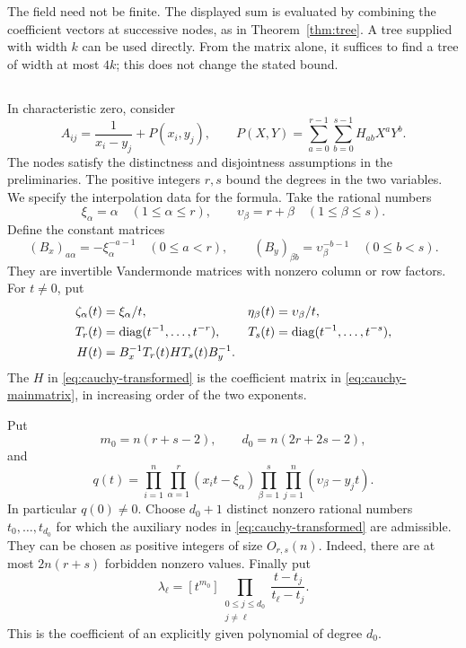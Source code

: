 \documentclass[11pt,reqno]{amsart}
\theoremstyle{remark}
\numberwithin{equation}{section}
\newcommand{\diag}{\operatorname{diag}}
\begin{document}
The field need not be finite. The displayed sum is evaluated by
combining the coefficient vectors at successive nodes, as in
Theorem~\ref{thm:tree}. A tree supplied with width \(k\) can be
used directly. From the matrix alone, it suffices to find a tree
of width at most \(4k\); this does not change the stated bound.

\subsection{}


In characteristic zero, consider
\begin{equation}\label{eq:cauchy-mainmatrix}
 A_{ij}=\frac1{x_i-y_j}+P(x_i,y_j),\qquad
 P(X,Y)=\sum_{a=0}^{r-1}\sum_{b=0}^{s-1}H_{ab}X^aY^b.
\end{equation}
The nodes satisfy the distinctness and disjointness assumptions
in the preliminaries. The positive integers \(r,s\) bound the
degrees in the two variables. We specify the interpolation data
for the formula.
Take the rational numbers
\[
 \xi_\alpha=\alpha\quad(1\leq\alpha\leq r),\qquad
 \upsilon_\beta=r+\beta\quad(1\leq\beta\leq s).
\]
Define the constant matrices
\[
 (B_x)_{a\alpha}=-\xi_\alpha^{-a-1}\quad(0\leq a<r),\qquad
 (B_y)_{\beta b}=\upsilon_\beta^{-b-1}\quad(0\leq b<s).
\]
They are invertible Vandermonde matrices with nonzero column or row
factors. For $t\ne0$, put
\begin{align}
 \zeta_\alpha(t)&=\xi_\alpha/t,&
 \eta_\beta(t)&=\upsilon_\beta/t,\notag\\
 T_r(t)&=\diag(t^{-1},\ldots,t^{-r}),&
 T_s(t)&=\diag(t^{-1},\ldots,t^{-s}),\notag\\
 H(t)&=B_x^{-1}T_r(t)H T_s(t)B_y^{-1}.
 \label{eq:cauchy-transformed}
\end{align}
The $H$ in \eqref{eq:cauchy-transformed} is the coefficient matrix in
\eqref{eq:cauchy-mainmatrix}, in increasing order of the two exponents.

Put
\begin{equation}\label{eq:cauchy-degrees}
 m_0=n(r+s-2),\qquad d_0=n(2r+2s-2),
\end{equation}
and
\begin{equation}\label{eq:cauchy-denpoly}
 q(t)=\prod_{i=1}^n\prod_{\alpha=1}^r(x_it-\xi_\alpha)
       \prod_{\beta=1}^s\prod_{j=1}^n(\upsilon_\beta-y_jt).
\end{equation}
In particular $q(0)\ne0$. Choose $d_0+1$ distinct nonzero rational
numbers $t_0,\ldots,t_{d_0}$ for which the auxiliary nodes in
\eqref{eq:cauchy-transformed} are admissible. They can be chosen as positive
integers of size $O_{r,s}(n)$. Indeed, there are at most
$2n(r+s)$ forbidden nonzero values. Finally put
\begin{equation}\label{eq:cauchy-lagrange}
 \lambda_\ell=[t^{m_0}]
 \prod_{\substack{0\leq j\leq d_0\\j\ne\ell}}
 \frac{t-t_j}{t_\ell-t_j}.
\end{equation}
This is the coefficient of an explicitly given polynomial of degree $d_0$.
\end{document}
